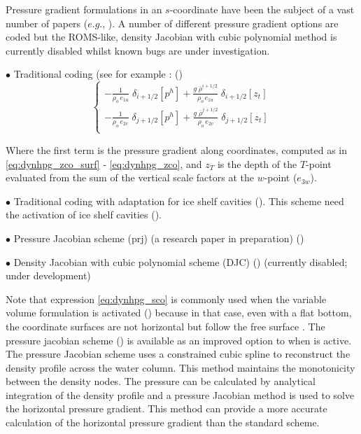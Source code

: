 \documentclass[../tex_main/NEMO_manual]{subfiles}
\begin{document}
Pressure gradient formulations in an $s$-coordinate have been the subject of a vast number of papers
($e.g.$, \citet{Song1998, Shchepetkin_McWilliams_OM05}). 
A number of different pressure gradient options are coded but the ROMS-like,
density Jacobian with cubic polynomial method is currently disabled whilst known bugs are under investigation.

$\bullet$ Traditional coding (see for example \citet{Madec_al_JPO96}: ()
\begin{equation} \label{eq:dynhpg_sco}
\left\{ \begin{aligned}
 - \frac{1}    					{\rho_o \, e_{1u}} \;	\delta _{i+1/2} \left[  p^h  \right] 
+ \frac{g\; \overline {\rho}^{i+1/2}}	{\rho_o \, e_{1u}} \;	\delta _{i+1/2} \left[  z_t   \right]    \\
 - \frac{1}    					{\rho_o \, e_{2v}} \;	\delta _{j+1/2} \left[  p^h  \right]  
+ \frac{g\; \overline {\rho}^{j+1/2}}	{\rho_o \, e_{2v}} \;	\delta _{j+1/2} \left[  z_t   \right]    \\
\end{aligned} \right.
\end{equation} 

Where the first term is the pressure gradient along coordinates,
computed as in \autoref{eq:dynhpg_zco_surf} - \autoref{eq:dynhpg_zco},
and $z_T$ is the depth of the $T$-point evaluated from the sum of the vertical scale factors at the $w$-point 
($e_{3w}$).
 
$\bullet$ Traditional coding with adaptation for ice shelf cavities ().
This scheme need the activation of ice shelf cavities ().

$\bullet$ Pressure Jacobian scheme (prj) (a research paper in preparation) ()

$\bullet$ Density Jacobian with cubic polynomial scheme (DJC) \citep{Shchepetkin_McWilliams_OM05} 
() (currently disabled; under development)

Note that expression \autoref{eq:dynhpg_sco} is commonly used when the variable volume formulation is activated
() because in that case, even with a flat bottom,
the coordinate surfaces are not horizontal but follow the free surface \citep{Levier2007}.
The pressure jacobian scheme () is available as
an improved option to  when  is active.
The pressure Jacobian scheme uses a constrained cubic spline to
reconstruct the density profile across the water column.
This method maintains the monotonicity between the density nodes.
The pressure can be calculated by analytical integration of the density profile and
a pressure Jacobian method is used to solve the horizontal pressure gradient.
This method can provide a more accurate calculation of the horizontal pressure gradient than the standard scheme.
\end{document}
